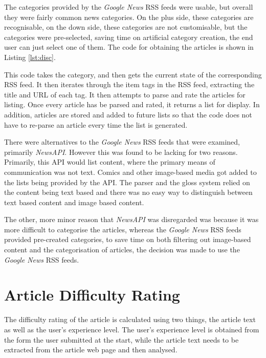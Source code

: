 The categories provided by the \textit{Google News} RSS feeds were usable, but overall they were fairly common news categories. On the plus side, these categories are recognisable, on the down side, these categories are not customisable, but the categories were pre-selected, saving time on artificial category creation, the end user can just select one of them. The code for obtaining the articles is shown in Listing \ref{lst:disc}.



This code takes the category, and then gets the current state of the corresponding RSS feed. It then iterates through the item tags in the RSS feed, extracting the title and URL of each tag. It then attempts to parse and rate the articles for listing. Once every article has be parsed and rated, it returns a list for display. In addition, articles are stored and added to future lists so that the code does not have to re-parse an article every time the list is generated.

There were alternatives to the \textit{Google News} RSS feeds that were examined, primarily \textit{NewsAPI}. However this was found to be lacking for two reasons. Primarily, this API would list content, where the primary means of communication was not text. Comics and other image-based media got added to the lists being provided by the API. The parser and the gloss system relied on the content being text based and there was no easy way to distinguish between text based content and image based content.

The other, more minor reason that \textit{NewsAPI} was disregarded was because it was more difficult to categorise the articles, whereas the \textit{Google News} RSS feeds provided pre-created categories, to save time on both filtering out image-based content and the categorisation of articles, the decision was made to use the \textit{Google News} RSS feeds. 


\section{Article Difficulty Rating}

The difficulty rating of the article is calculated using two things, the article text as well as the user's experience level. The user's experience level is obtained from the form the user submitted at the start, while the article text needs to be extracted from the article web page and then analysed.

